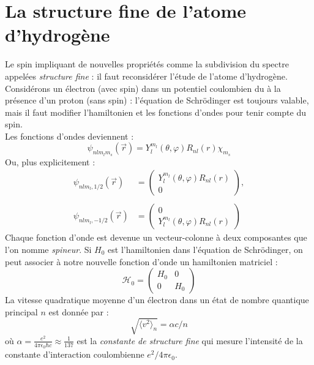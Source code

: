 \documentclass	[11pt, a4paper, openany]{book}
\begin{document}
	\section{La structure fine de l'atome d'hydrogène}
	Le spin impliquant de nouvelles propriétés comme la subdivision du spectre appelées 
	\textit{structure fine} : il faut reconsidérer l'étude de l'atome d'hydrogène.\\
	Considérons un électron (avec spin) dans un potentiel coulombien du à la présence 
	d'un proton (sans spin) : l'équation de Schrödinger est toujours valable, mais il 
	faut modifier l'hamiltonien et les fonctions d'ondes pour tenir compte du spin.\\
	Les fonctions d'ondes deviennent : 
	\begin{equation}
		\psi_{nlm_lm_s}(\vec{r}) = Y_l^{m_l}(\theta,\varphi)R_{nl}(r)\chi_{m_s}
	\end{equation}
	Ou, plus explicitement :
	\begin{equation}
		\begin{array}{ll}
			\psi_{nlm_l,1/2}(\vec{r}) & = \left(\begin{array}{cc} 
			Y_l^{m_l}(\theta,\varphi)R_{nl}(r)\\
			0
		\end{array}\right),\\
		& \\
		\psi_{nlm_l,-1/2}(\vec{r}) &= \left(\begin{array}{cc}
		0\\
		Y_l^{m_l}(\theta,\varphi)R_{nl}(r)
		\end{array}\right)
		\end{array}
	\end{equation}
	Chaque fonction d'onde est devenue un vecteur-colonne à deux composantes que l'on 
	nomme \textit{spineur}. Si $H_0$ est l’hamiltonien dans l'équation de Schrödinger,
	on peut associer à notre nouvelle fonction d'onde un hamiltonien matriciel :
	\begin{equation}
		\mathcal{H}_0 =\left(\begin{array}{cc}
		H_0 & 0\\
		0 & H_0
		\end{array}\right)
	\end{equation}
	La vitesse quadratique moyenne d'un électron dans un état de nombre quantique 
	principal $n$ est donnée par :
	\begin{equation}
		\sqrt{\langle v^2\rangle_n} = \alpha c/n
	\end{equation}
	où $\alpha = \frac{e^2}{4\pi\epsilon_0\hbar c}	 \approx \frac{1}{137}$ est la \textit{
	constante de structure fine} qui mesure l'intensité de la constante d'interaction 
	coulombienne $e^2/4\pi\epsilon_0$.\\
		
\end{document}
